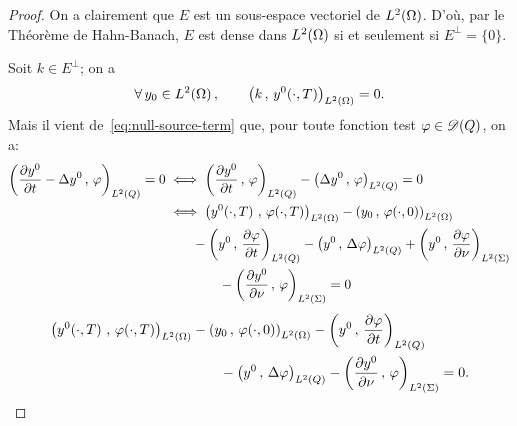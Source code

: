 \begin{proof}%
    On a clairement que $E$ est un sous-espace vectoriel de
    $L^{2}\!\left({\Omega}\right)$. D'où, par le Théorème de Hahn-Banach, $E$ est dense
    dans $L^{2}\!\left({\Omega}\right)$ si et seulement si $E^{\perp} = \{0\}$.

    Soit $k\in E^{\perp}$; on a
    \begin{equation*}\label{eq:proof-controllability-26}
        \forall\,y_{0}\in L^{2}\!\left({\Omega}\right),\qquad
        {\left({ k\,,\,y^{0}\!\left({\cdot,T}\right) }\right)}_{L^{2}\left({\Omega}\right)} = 0.
    \end{equation*}
    Mais il vient de~\eqref{eq:null-source-term} que, pour toute fonction
    test $\varphi\in\mathscr{D}(Q)$, on a:
    \begin{equation*}
        \begin{split}
            \scalaireq{\primetemps{y^{0}} - \Delta y^{0}}{\vphi} = 0 &\iff
            \scalaireq{\primetemps{y^{0}}}{\vphi} - \scalaireq{\Delta
            y^{0}}{\vphi} = 0\\
            &\iff \scalaireohm{%
                y^{0}\!\left({\cdot,T}\right)
            }{%
                \vphi\!\left({\cdot,T}\right)
            } - \scalaireohm{%
                y_{0}
            }{%
                \vphi\!\left({\cdot,0}\right)
            }\\
            &\qquad - \scalaireq{y^{0}}{\primetemps{\vphi}} - \scalaireq{y^{0}
            }{%
                \Delta \vphi
            } + \scalaires{y^{0}
            }{\deriveenormale{\vphi}
            }\\
            &\qquad\qquad - \scalaires{\deriveenormale{y^{0}}}{\vphi} = 0
        \end{split}
    \end{equation*}
    \ie{}
    \begin{equation}\label{eq:controllability-proof-30}
        \begin{split}
            \scalaireohm{%
                y^{0}\!\left({\cdot,T}\right)
            }{%
                \vphi\!\left({\cdot,T}\right)
            } &- \scalaireohm{%
                y_{0}
            }{%
                \vphi\!\left({\cdot,0}\right)
            } - \scalaireq{%
                y^{0}
            }{%
                \primetemps{\vphi}
            }\\
            &\qquad - \scalaireq{%
                y^{0}
            }{%
                \Delta\vphi
            } - \scalaires{%
                \deriveenormale{y^{0}}
            }{\vphi} = 0.
        \end{split}

\end{equation}
\end{proof}
